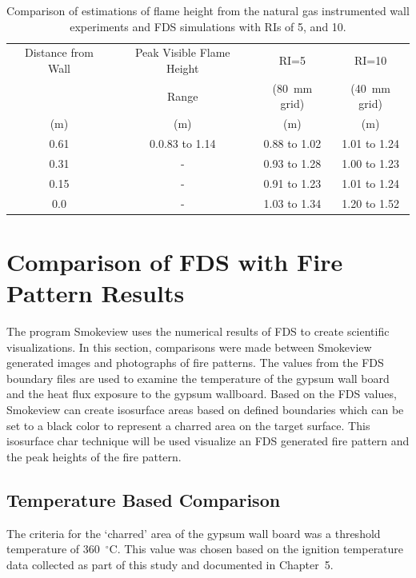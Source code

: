 \documentclass[twoside]{uocthesis}
\begin{document}
{\begin{table}[h]
  \small
  \centering
  \begin{tabular}{|c|c|c|c|} \hline 
Distance from Wall 		&  Peak Visible Flame Height 			  	& RI=5       		& RI=10      		  \\
    					&  Range          				&  (80~mm grid)  	&  (40~mm grid)  	  \\
    (m)					&  (m) 							& (m) 				& (m) 				  \\ 
\hline    0.61			&  0.0.83 to 1.14         		& 0.88 to 1.02      & 1.01 to 1.24         \\
\hline    0.31			&		-						& 0.93 to 1.28		& 1.00 to 1.23		    \\
\hline    0.15			&		-						& 0.91 to 1.23		& 1.01 to 1.24			\\
\hline	  0.0			&		-						& 1.03 to 1.34		& 1.20 to 1.52   	  \\
\hline
  \end{tabular}
  \caption[Comparison of estimations of flame height from the natural gas instrumented wall experiments and FDS simulations with RIs of 5 and 10.]{Comparison of estimations of flame height from the natural gas instrumented wall experiments and FDS simulations with RIs of 5, and 10.}
  \label{tab:FDS_FH_IWNG}
\end{table}

\section{Comparison of FDS with Fire Pattern Results}

The program Smokeview uses the numerical results of FDS to create scientific visualizations.  In this section, comparisons were made between Smokeview generated images and photographs of fire patterns. The values from the FDS boundary files are used to examine the temperature of the gypsum wall board and the heat flux exposure to the gypsum wallboard.  Based on the FDS values, Smokeview can create isosurface areas based on defined boundaries which can be set to a black color to represent a charred area on the target surface.  This isosurface char technique will be used visualize an FDS generated fire pattern and the peak heights of the fire pattern.

\subsection{Temperature Based Comparison}

The criteria for the `charred' area of the gypsum wall board was a threshold temperature of 360~$^\circ$C.  This value was chosen based on the ignition temperature data collected as part of this study and documented in Chapter~5. 

}
\end{document}
